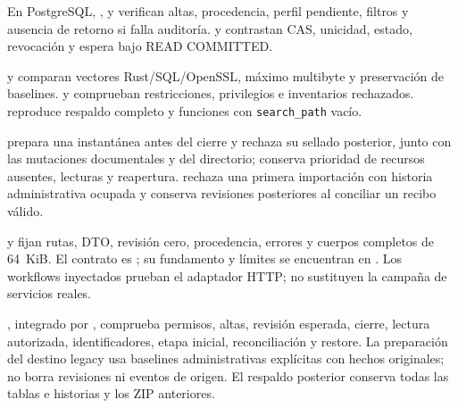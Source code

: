 {\raggedright En PostgreSQL, ,  y  verifican altas, procedencia, perfil pendiente, filtros y ausencia de retorno si falla auditoría.  y  contrastan CAS, unicidad, estado, revocación y espera bajo READ COMMITTED.\par}

{\raggedright {} y  comparan vectores Rust/SQL/OpenSSL, máximo multibyte y preservación de baselines.  y  comprueban restricciones, privilegios e inventarios rechazados.  reproduce respaldo completo y funciones con \texttt{search\_path} vacío.\par}

{\raggedright {} prepara una instantánea antes del cierre y rechaza su sellado posterior, junto con las mutaciones documentales y del directorio; conserva prioridad de recursos ausentes, lecturas y reapertura.  rechaza una primera importación con historia administrativa ocupada y conserva revisiones posteriores al conciliar un recibo válido.\par}

{\raggedright {} y  fijan rutas, DTO, revisión cero, procedencia, errores y cuerpos completos de 64~KiB. El contrato es ; su fundamento y límites se encuentran en . Los workflows inyectados prueban el adaptador HTTP; no sustituyen la campaña de servicios reales.\par}

{\raggedright {}, integrado por , comprueba permisos, altas, revisión esperada, cierre, lectura autorizada, identificadores, etapa inicial, reconciliación y restore. La preparación del destino legacy usa baselines administrativas explícitas con hechos originales; no borra revisiones ni eventos de origen. El respaldo posterior conserva todas las tablas e historias y los ZIP anteriores.\par}

